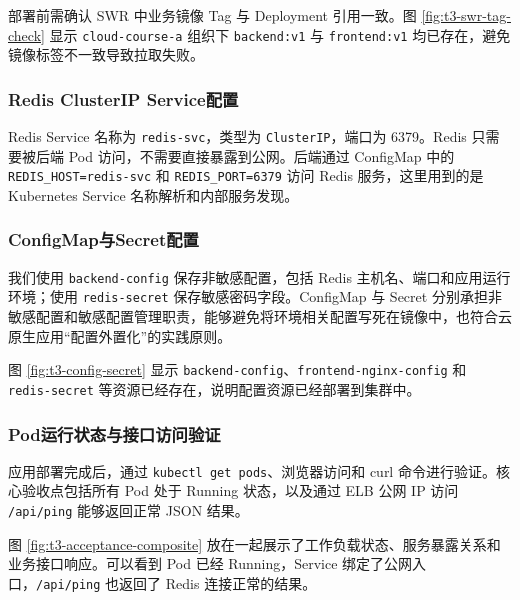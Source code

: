 
部署前需确认 SWR 中业务镜像 Tag 与 Deployment 引用一致。图 \ref{fig:t3-swr-tag-check} 显示 \verb|cloud-course-a| 组织下 \verb|backend:v1| 与 \verb|frontend:v1| 均已存在，避免镜像标签不一致导致拉取失败。


\subsubsection{Redis ClusterIP Service配置}

Redis Service 名称为 \verb|redis-svc|，类型为 \verb|ClusterIP|，端口为 6379。Redis 只需要被后端 Pod 访问，不需要直接暴露到公网。后端通过 ConfigMap 中的 \verb|REDIS_HOST=redis-svc| 和 \verb|REDIS_PORT=6379| 访问 Redis 服务，这里用到的是 Kubernetes Service 名称解析和内部服务发现。

\subsubsection{ConfigMap与Secret配置}

我们使用 \verb|backend-config| 保存非敏感配置，包括 Redis 主机名、端口和应用运行环境；使用 \verb|redis-secret| 保存敏感密码字段。ConfigMap 与 Secret 分别承担非敏感配置和敏感配置管理职责，能够避免将环境相关配置写死在镜像中，也符合云原生应用“配置外置化”的实践原则。


图 \ref{fig:t3-config-secret} 显示 \verb|backend-config|、\verb|frontend-nginx-config| 和 \verb|redis-secret| 等资源已经存在，说明配置资源已经部署到集群中。

\subsubsection{Pod运行状态与接口访问验证}

应用部署完成后，通过 \verb|kubectl get pods|、浏览器访问和 curl 命令进行验证。核心验收点包括所有 Pod 处于 Running 状态，以及通过 ELB 公网 IP 访问 \verb|/api/ping| 能够返回正常 JSON 结果。

图 \ref{fig:t3-acceptance-composite} 放在一起展示了工作负载状态、服务暴露关系和业务接口响应。可以看到 Pod 已经 Running，Service 绑定了公网入口，\verb|/api/ping| 也返回了 Redis 连接正常的结果。

